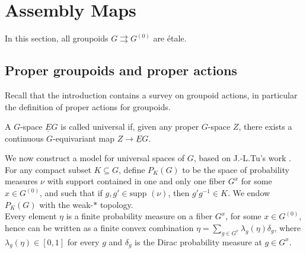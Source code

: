 \section{Assembly Maps}

In this section, all groupoids $G\rightrightarrows G^{(0)}$ are étale. 

\subsection{Proper groupoids and proper actions}

Recall that the introduction contains a survey on groupoid actions, in particular the definition of proper actions for groupoids.


\begin{definition}
A $G$-space $\underline E G$ is called universal if, given any proper $G$-space $Z$, there exists a continuous $G$-equivariant map $Z\rightarrow \underline E G$.
\end{definition}

We now construct a model for universal spaces of $G$, based on J.-L.Tu's work \cite{TuBC2}. For any compact subset $K\subseteq G$, define $P_K(G)$ to be the space of probability measures $\nu $ with support contained in one and only one fiber $G^x$ for some $x\in G^{(0)}$, and such that if $g,g'\in \text{supp }(\nu)$, then $g'g^{-1}\in K$. We endow $P_K(G)$ with the weak-$*$ topology.\\

Every element $\eta$ is a finite probability measure on a fiber $G^x$, for some $x\in G^{(0)}$, hence can be written as a finite convex combination $\eta = \sum_{g\in G^{x}}\lambda_g(\eta)\delta_g$, where $\lambda_g(\eta)\in [0,1]$ for every $g$ and $\delta_g$ is the Dirac probability measure at $g\in G^x$.\\ 

